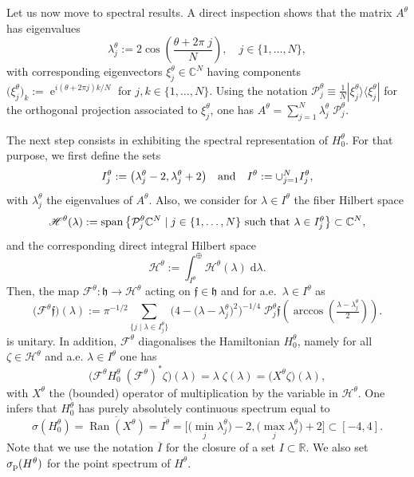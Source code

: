 \documentclass[11pt]{article}
\def\C{\mathbb C}
\def\d{\mathrm d}
\def\f{\mathfrak f}
\def\F{\mathscr F}
\def\Hrond{\mathscr H}
\def\h{\mathfrak h}
\def\P{\mathcal P}
\def\R{\mathbb R}
\def\e{\mathop{\mathrm{e}}\nolimits}
\def\Ran{\mathop{\mathrm{Ran}}\nolimits}
\def\sp{\mathop{\mathrm{span}}\nolimits}
\begin{document}
Let us now move to spectral results. 
A direct inspection shows that the matrix $A^\theta$ has eigenvalues
\begin{equation}\label{eq_eigenvalues}
\lambda_j^\theta:=2\cos\left(\frac{\theta+2\pi\;\!j}N\right),\quad j\in\{1,\dots,N\},
\end{equation}
with corresponding eigenvectors $\xi_j^\theta\in\C^N$ having components
$\big(\xi_j^\theta\big)_k:=\e^{i(\theta+2\pi j)k/N}$ for $j,k\in\{1,\dots,N\}$. Using the
notation $\P_j^\theta\equiv \tfrac{1}{N}|\xi^\theta_j\rangle \langle \xi^\theta_{j}|$ for the orthogonal projection associated to $\xi_j^\theta$, one has 
$A^\theta=\sum_{j=1}^N\lambda_j^\theta\;\!\P_j^\theta$.

The next step consists in exhibiting the spectral representation of $H_0^\theta$.
For that purpose, we first define the sets
\begin{equation*}
I_j^\theta:=\big(\lambda_j^\theta-2,\lambda_j^\theta+2\big)
\quad\hbox{and}\quad
I^\theta:=\cup_{j=1}^NI^\theta_j,
\end{equation*}
with $\lambda_j^\theta$ the eigenvalues of $A^\theta$. 
Also, we consider for $\lambda\in I^\theta$ the fiber Hilbert space
$$
\Hrond^\theta(\lambda)
:=\sp\big\{\P^\theta_j\C^N\mid\hbox{$j\in\{1,\dots,N\}$ such that
$\lambda\in I_j^\theta$}\big\}\subset\C^N,
$$
and the corresponding direct integral Hilbert space
\begin{equation}\label{eq_Hrond}
\Hrond^\theta:=\int_{I^\theta}^\oplus\Hrond^\theta(\lambda)\;\!\d\lambda.
\end{equation}
Then, the map $\F^\theta:\h\to\Hrond^\theta$ 
acting on $\f\in\h$ and for a.e.~$\lambda\in I^\theta$ as
$$
\big(\F^\theta \f\big)(\lambda)
:=\pi^{-1/2}\sum_{\{j\mid\lambda\in I_j^\theta\}}
\big(4-\big(\lambda-\lambda_j^\theta\big)^2\big)^{-1/4}\;\!\P^\theta_j
\f\left(\arccos\left(\tfrac{\lambda-\lambda_j^\theta}2\right)\right).
$$
is unitary.
In addition, $\F^\theta$ diagonalises the Hamiltonian $H_0^\theta$, namely for all
$\zeta\in\Hrond^\theta$ and a.e. $\lambda\in I^\theta$ one has
\begin{equation*}
\big(\F^\theta H_0^\theta\;\!(\F^{\theta})^*\zeta\big)(\lambda)
=\lambda\;\!\zeta(\lambda)
=\big(X^\theta\zeta\big)(\lambda),
\end{equation*}
with $X^\theta$ the (bounded) operator of multiplication by the variable in
$\Hrond^\theta$.
One infers  that
$H_0^\theta$ has purely absolutely continuous spectrum equal to
\begin{equation*}
\textstyle\sigma(H_0^\theta)
=\overline{\Ran(X^\theta)}
=\overline{I^\theta}
=\big[\big(\min_j\lambda_j^\theta\big)-2,\big(\max_j\lambda_j^\theta\big)+2\big]
\subset[-4,4].
\end{equation*}
Note that we use the notation  $\overline{I}$ for the closure of a set $I\subset \R$.
We also set $\sigma_{\rm p}(H^\theta)$ for the point spectrum of $H^\theta$.
\end{document}
